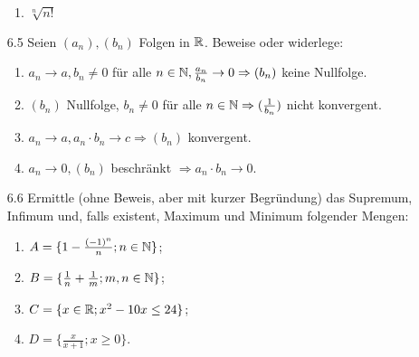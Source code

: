 \documentclass{HM}
\begin{document}
\begin{enumerate}
\begin{enumerate}
		\item $\sqrt[n]{n!}$\\
		
	\end{enumerate}
	\item[6.5] Seien $(a_n), (b_n)$ Folgen in $\mathbb{R}$. Beweise oder widerlege:
	\begin{enumerate}
		\item $a_n\to a, b_n\neq 0$ für alle $n\in\mathbb{N}, \frac{a_n}{b_n}\to 0 \Rightarrow (b_n)$ keine Nullfolge.
		\item $(b_n)$ Nullfolge, $b_n\neq 0$ für alle $n\in\mathbb{N}\Rightarrow (\frac{1}{b_n})$ nicht konvergent.
		\item $a_n\to a, a_n\cdot b_n \to c \Rightarrow (b_n)$ konvergent.
		\item $a_n\to 0, (b_n)$ beschränkt $\Rightarrow a_n\cdot b_n \to 0$.
	\end{enumerate}
	\item[6.6] Ermittle (ohne Beweis, aber mit kurzer Begründung) das Supremum, Infimum und, falls existent, Maximum und Minimum folgender Mengen:
	\begin{enumerate}
		\item $A=\lbrace 1-\frac{(-1)^n}{n}; n\in\mathbb{N}\rbrace$;
		\item $B=\lbrace \frac{1}{n}+\frac{1}{m}; m,n\in\mathbb{N}\rbrace$;
		\item $C=\lbrace x\in\mathbb{R}; x^2-10x\leq 24\rbrace$;
		\item $D=\lbrace \frac{x}{x+1}; x\geq 0\rbrace$.
	\end{enumerate}
\end{enumerate}
\end{document}
